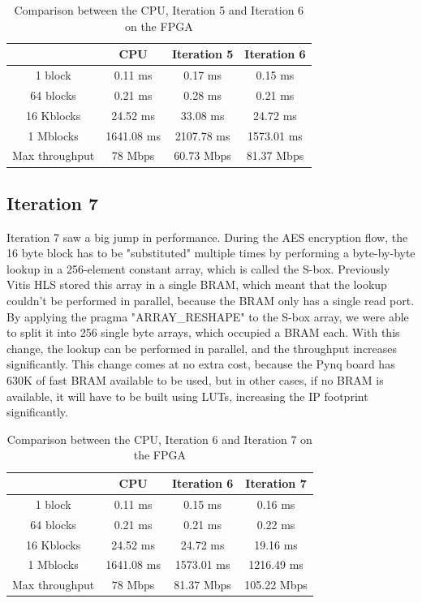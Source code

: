 \documentclass[12pt,oneside,a4paper]{article}
\begin{document}
\begin{table}[h!]
	\centering
	\begin{tabular}{cccc}
		\toprule
		 & CPU & Iteration 5 & Iteration 6 \\
		\midrule
		1 block & 0.11 ms & 0.17 ms & 0.15 ms \\
		64 blocks & 0.21 ms & 0.28 ms & 0.21 ms \\
		16 Kblocks & 24.52 ms & 33.08 ms & 24.72 ms \\
		1 Mblocks & 1641.08 ms & 2107.78 ms & 1573.01 ms \\
		Max throughput & 78 Mbps & 60.73 Mbps & 81.37 Mbps \\
		\bottomrule
	\end{tabular}
	\caption{Comparison between the CPU, Iteration 5 and Iteration 6 on the FPGA}
\end{table}

\subsection{Iteration 7} \label{subsec:iter7}
Iteration 7 saw a big jump in performance. 
During the AES encryption flow, the 16 byte block has to be "substituted" multiple times by performing a byte-by-byte lookup in a 256-element constant array, which is called the S-box.
Previously Vitis HLS stored this array in a single BRAM, which meant that the lookup couldn't be performed in parallel, because the BRAM only has a single read port.
By applying the pragma "ARRAY\_RESHAPE" to the S-box array, we were able to split it into 256 single byte arrays, which occupied a BRAM each. With this change, the lookup can be performed in parallel, and the throughput increases significantly.
This change comes at no extra cost, because the Pynq board has 630K of fast BRAM available to be used, but in other cases, if no BRAM is available, it will have to be built using LUTs, increasing the IP footprint significantly.

\begin{table}[h!]
	\centering
	\begin{tabular}{cccc}
		\toprule
		 & CPU & Iteration 6 & Iteration 7 \\
		\midrule
		1 block & 0.11 ms & 0.15 ms & 0.16 ms \\
		64 blocks & 0.21 ms & 0.21 ms & 0.22 ms \\
		16 Kblocks & 24.52 ms & 24.72 ms & 19.16 ms \\
		1 Mblocks & 1641.08 ms & 1573.01 ms & 1216.49 ms \\
		Max throughput & 78 Mbps & 81.37 Mbps & 105.22 Mbps \\
		\bottomrule
	\end{tabular}
	\caption{Comparison between the CPU, Iteration 6 and Iteration 7 on the FPGA}
\end{table}
\end{document}
